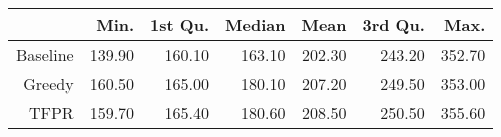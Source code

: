 \begin{table}[ht]
\centering
\begin{tabular}{rrrrrrr}
  \hline
 & Min. & 1st Qu. & Median & Mean & 3rd Qu. & Max. \\ 
  \hline
Baseline & 139.90 & 160.10 & 163.10 & 202.30 & 243.20 & 352.70 \\ 
  Greedy & 160.50 & 165.00 & 180.10 & 207.20 & 249.50 & 353.00 \\ 
  TFPR & 159.70 & 165.40 & 180.60 & 208.50 & 250.50 & 355.60 \\ 
   \hline
\end{tabular}
\end{table}
